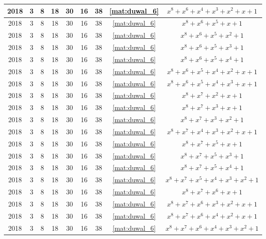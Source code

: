 \begin{longtable}{|c|c|c|c|c|c|c|c|c|}
2018 & 3 & 8 & 18 & 30 & 16 & 38 & \eqref{mat:duwal_6} & $x^8 + x^6 + x^4 + x^3 + x^2 + x + 1$ \\ \hline 
2018 & 3 & 8 & 18 & 30 & 16 & 38 & \eqref{mat:duwal_6} & $x^8 + x^6 + x^5 + x + 1$ \\ \hline 
2018 & 3 & 8 & 18 & 30 & 16 & 38 & \eqref{mat:duwal_6} & $x^8 + x^6 + x^5 + x^2 + 1$ \\ \hline 
2018 & 3 & 8 & 18 & 30 & 16 & 38 & \eqref{mat:duwal_6} & $x^8 + x^6 + x^5 + x^3 + 1$ \\ \hline 
2018 & 3 & 8 & 18 & 30 & 16 & 38 & \eqref{mat:duwal_6} & $x^8 + x^6 + x^5 + x^4 + 1$ \\ \hline 
2018 & 3 & 8 & 18 & 30 & 16 & 38 & \eqref{mat:duwal_6} & $x^8 + x^6 + x^5 + x^4 + x^2 + x + 1$ \\ \hline 
2018 & 3 & 8 & 18 & 30 & 16 & 38 & \eqref{mat:duwal_6} & $x^8 + x^6 + x^5 + x^4 + x^3 + x + 1$ \\ \hline 
2018 & 3 & 8 & 18 & 30 & 16 & 38 & \eqref{mat:duwal_6} & $x^8 + x^7 + x^2 + x + 1$ \\ \hline 
2018 & 3 & 8 & 18 & 30 & 16 & 38 & \eqref{mat:duwal_6} & $x^8 + x^7 + x^3 + x + 1$ \\ \hline 
2018 & 3 & 8 & 18 & 30 & 16 & 38 & \eqref{mat:duwal_6} & $x^8 + x^7 + x^3 + x^2 + 1$ \\ \hline 
2018 & 3 & 8 & 18 & 30 & 16 & 38 & \eqref{mat:duwal_6} & $x^8 + x^7 + x^4 + x^3 + x^2 + x + 1$ \\ \hline 
2018 & 3 & 8 & 18 & 30 & 16 & 38 & \eqref{mat:duwal_6} & $x^8 + x^7 + x^5 + x + 1$ \\ \hline 
2018 & 3 & 8 & 18 & 30 & 16 & 38 & \eqref{mat:duwal_6} & $x^8 + x^7 + x^5 + x^3 + 1$ \\ \hline 
2018 & 3 & 8 & 18 & 30 & 16 & 38 & \eqref{mat:duwal_6} & $x^8 + x^7 + x^5 + x^4 + 1$ \\ \hline 
2018 & 3 & 8 & 18 & 30 & 16 & 38 & \eqref{mat:duwal_6} & $x^8 + x^7 + x^5 + x^4 + x^3 + x^2 + 1$ \\ \hline 
2018 & 3 & 8 & 18 & 30 & 16 & 38 & \eqref{mat:duwal_6} & $x^8 + x^7 + x^6 + x + 1$ \\ \hline 
2018 & 3 & 8 & 18 & 30 & 16 & 38 & \eqref{mat:duwal_6} & $x^8 + x^7 + x^6 + x^3 + x^2 + x + 1$ \\ \hline 
2018 & 3 & 8 & 18 & 30 & 16 & 38 & \eqref{mat:duwal_6} & $x^8 + x^7 + x^6 + x^4 + x^2 + x + 1$ \\ \hline 
2018 & 3 & 8 & 18 & 30 & 16 & 38 & \eqref{mat:duwal_6} & $x^8 + x^7 + x^6 + x^4 + x^3 + x^2 + 1$ \\ \hline 

\end{longtable}
